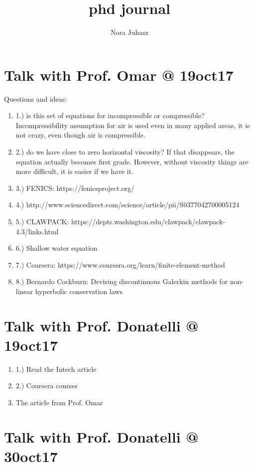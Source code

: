 \documentclass{article}
\title{phd journal}
\author{Nora Juhasz}
\begin{document}
\maketitle
\newpage

\tableofcontents
\newpage

\section{Talk with Prof. Omar @ 19oct17}

Questions and ideas:
\begin{enumerate}
\item 1.) is this set of equations for incompressible or compressible? Incompressibility assumption for air is used even in many applied areas, it is not crazy, even though air is compressible.
\item 2.) do we have close to zero horizontal viscosity? If that disappears, the equation actually becomes first grade. However, without viscosity things are more difficult, it is easier if we have it.
\item 3.) FENICS: https://fenicsproject.org/
\item 4.) http://www.sciencedirect.com/science/article/pii/S0377042700005124
\item 5.) CLAWPACK: https://depts.washington.edu/clawpack/clawpack-4.3/links.html
\item 6.) Shallow water equation
\item 7.) Coursera: https://www.coursera.org/learn/finite-element-method
\item 8.) Bernardo Cockburn: Devising discontinuous Galerkin methods for non-linear hyperbolic conservation laws
\end{enumerate}

\section{Talk with Prof. Donatelli @ 19oct17}

\begin{enumerate}
\item 1.) Read the Intech article
\item 2.) Coursera courses
\item The article from Prof. Omar
\end{enumerate}


\section{Talk with Prof. Donatelli @ 30oct17}
\end{document}
